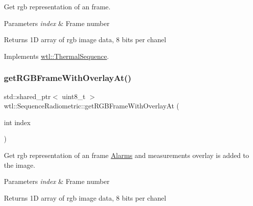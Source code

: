 Get rgb representation of an frame. 


\begin{DoxyParams}{Parameters}
{\em index} & Frame number \\
\hline
\end{DoxyParams}
\begin{DoxyReturn}{Returns}
1D array of rgb image data, 8 bits per chanel 
\end{DoxyReturn}


Implements \hyperlink{classwtl_1_1_thermal_sequence_a0d13f29f0f89343516031c5146b62792}{wtl\+::\+Thermal\+Sequence}.

\mbox{\label{classwtl_1_1_sequence_radiometric_a04ca24ba12175157835a6f2cb8495971}} 
\subsubsection{\texorpdfstring{get\+R\+G\+B\+Frame\+With\+Overlay\+At()}{getRGBFrameWithOverlayAt()}}
{\footnotesize\ttfamily std\+::shared\+\_\+ptr$<$ uint8\+\_\+t $>$ wtl\+::\+Sequence\+Radiometric\+::get\+R\+G\+B\+Frame\+With\+Overlay\+At (\begin{DoxyParamCaption}\item[{int}]{index }\end{DoxyParamCaption})}



Get rgb representation of an frame \hyperlink{classwtl_1_1_alarms}{Alarms} and measurements overlay is added to the image. 


\begin{DoxyParams}{Parameters}
{\em index} & Frame number \\
\hline
\end{DoxyParams}
\begin{DoxyReturn}{Returns}
1D array of rgb image data, 8 bits per chanel 
\end{DoxyReturn}
\mbox{\label{classwtl_1_1_sequence_radiometric_aa0b063cfe218f95cd57412344d4f9a04}} 
